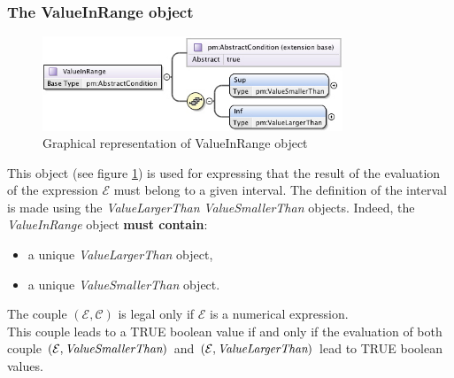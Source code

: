 \documentclass[a4paper,11pt] {article}
\begin{document}
\subsubsection{The ValueInRange object}
\begin{figure}[htbp]
\begin{center}
\includegraphics[width=0.8\textwidth]{pictures/ValueInRange.jpg} 
\caption{Graphical representation of ValueInRange object}
\label{Pic-ValueInRange}
\end{center}
\end{figure}
This object (see figure \ref{Pic-ValueInRange}) is used for expressing that the result of the
evaluation of the expression $\mathcal E$ must belong to a given interval. The definition of the
interval is made using the {\it ValueLargerThan} {\it ValueSmallerThan} objects.
Indeed, the {\it ValueInRange} object {\bf must contain}:
\begin{itemize}
\item a unique {\it ValueLargerThan} object,
\item a unique {\it ValueSmallerThan} object. 
\end{itemize}
The couple $(\mathcal E, \mathcal C)$ is legal only if $\mathcal E$ is a numerical expression.\\
This couple leads to a TRUE boolean value if and only if the evaluation of both couple $(\mathcal E,
\mbox{\it ValueSmallerThan})$ and $(\mathcal E, \mbox{\it ValueLargerThan})$ lead to TRUE boolean
values.
\end{document}
